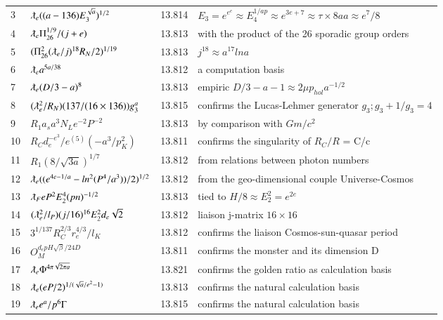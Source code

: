 \documentclass[a4paper,9pt]{article}
\begin{document}
\begin{appendix}
\begin{table}
\begin{tabular}{llll}
   3 & $\lambdabar_{e} ((a-136)E_3^{\sqrt a})^{1/2}$ & 13.814 & $E_3 = e^{e^e} \approx E_4^{1/ap} \approx e^{3e+7}\approx \tau \times 8a a\approx e^7/8$ \\
   4 & $\lambdabar_{e} \Pi_{26}^{1/9}/(j+e)$ & 13.813 & with the product of the 26 sporadic group orders\\
   5 & $(\Pi_{26}^2(\lambdabar_e/j)^{18}R_N/2)^{1/19}$ & 13.813 & $j^{18} \approx a^{17} lna$\\
   6 & $\lambdabar_{e} a^{5a/38}$ & 13.812 & a computation basis\\
  7 & $\lambdabar_{e} (D/3 - a)^8$ & 13.813 & empiric $D/3 -a -1 \approx 2\mu p_{hol}a^{-1/2}$\\
   8 & $(\lambdabar_{e}^2/R_N) (137/(16 \times 136)) g_3^a$ & 13.815 & confirms the Lucas-Lehmer generator $g_3 ; g_3 +1/g_3 = 4$\\
   9 & $R_1 a_s a^3 N_L e^{-2}P^{-2}$ & 13.813 & by comparison with $Gm/c^2$\\
   10 & $R_C d_e^{-e^3}/e^{(5)}(-a^3/p_K^2)$ & 13.811 & confirms the singularity of $R_C/R$ = C/c\\
   11 & $R_1 (8/\sqrt{3a})^{1/7}$ & 13.812 & from relations between photon numbers \\
   12 & $\lambdabar_{e} ((e^{4e-1/a} - ln^2(P^4/a^3))/2)^{1/2}$ & 13.812 & from the geo-dimensional couple Universe-Cosmos\\
   13 & $\lambdabar_{F} e P^2E_2^4(pn)^{-1/2}$ & 13.813 &tied to $H/8 \approx E_2^2 = e^{2e}$\\
   14 & $(\lambdabar_{e}^2/l_P) (j/16)^{16}E_2^2 d_e \sqrt 2$ & 13.812 & liaison j-matrix $16 \times 16$\\
   15 & $3^{1/137} R_{C}^{2/3} r_e^{4/3} /l_K$ & 13.812 & confirms the liaison Cosmos-sun-quasar period\\
   16 & $O_M^{d_e pH\sqrt\beta / 24D}$ & 13.811 & confirms the monster and its dimension D\\
      17 & $\lambdabar_{e} \Phi ^{4\pi\sqrt{2\pi a}} $ & 13.821 & confirms the golden ratio as calculation basis\\
    
    
    
     18 & $\lambdabar_{e} (eP/2)^{1/(\sqrt a/e^2 - 1)} $ & 13.813 & confirms the natural calculation basis\\
     
     19 & $\lambdabar_{e} e^a/p^6\Gamma $ & 13.815 & confirms the natural calculation basis\\
     

\end{tabular}
\end{table}
\end{appendix}
\end{document}

